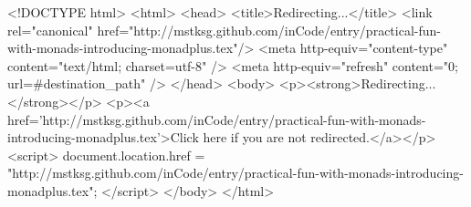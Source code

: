 <!DOCTYPE html>
<html>
<head>
<title>Redirecting...</title>
<link rel="canonical" href="http://mstksg.github.com/inCode/entry/practical-fun-with-monads-introducing-monadplus.tex"/>
<meta http-equiv="content-type" content="text/html; charset=utf-8" />
<meta http-equiv="refresh" content="0; url=#{destination_path}" />
</head>
<body>
  <p><strong>Redirecting...</strong></p>
  <p><a href='http://mstksg.github.com/inCode/entry/practical-fun-with-monads-introducing-monadplus.tex'>Click here if you are not redirected.</a></p>
  <script>
    document.location.href = "http://mstksg.github.com/inCode/entry/practical-fun-with-monads-introducing-monadplus.tex";
  </script>
</body>
</html>
